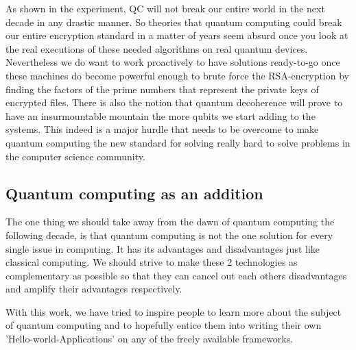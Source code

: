 As shown in the experiment, QC will not break our entire world in the next decade in any drastic manner. So theories that quantum computing could break our entire encryption standard in a matter of years seem absurd once you look at the real executions of these needed algorithms on real quantum devices.
Nevertheless we do want to work proactively to have solutions ready-to-go once these machines do become powerful enough to brute force the RSA-encryption by finding the factors of the prime numbers that represent the private keys of encrypted files.
There is also the notion that quantum decoherence will prove to have an insurmountable mountain the more qubits we start adding to the systems. This indeed is a major hurdle that needs to be overcome to make quantum computing the new standard for solving really hard to solve problems in the computer science community.

\subsection{Quantum computing as an addition}

The one thing we should take away from the dawn of quantum computing the following decade, is that quantum computing is not the one solution for every single issue in computing. It has its advantages and disadvantages just like classical computing. We should strive to make these 2 technologies as complementary as possible so that they can cancel out each others disadvantages and amplify their advantages respectively. 

With this work, we have tried to inspire people to learn more about the subject of quantum computing and to hopefully entice them into writing their own 'Hello-world-Applications' on any of the freely available frameworks.







